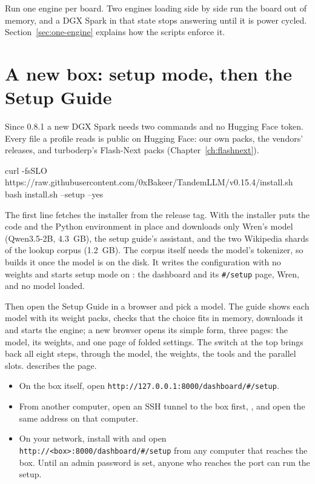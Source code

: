 Run one engine per board. Two engines loading side by side run the board out of memory, and a DGX Spark in that state stops answering until it is power cycled. Section~\ref{sec:one-engine} explains how the scripts enforce it.

\section{A new box: setup mode, then the Setup Guide}\label{sec:new-box}

Since 0.8.1 a new DGX Spark needs two commands and no Hugging Face token. Every file a profile reads is public on Hugging Face: our own packs, the vendors' releases, and turboderp's Flash-Next packs (Chapter~\ref{ch:flashnext}).

\begin{shell}
curl -fsSLO https://raw.githubusercontent.com/0xBakeer/TandemLLM/v0.15.4/install.sh
bash install.sh --setup --yes
\end{shell}

The first line fetches the installer from the release tag. With  the installer puts the code and the Python environment in place and downloads only Wren's model (Qwen3.5-2B, 4.3~GB), the setup guide's assistant, and the two Wikipedia shards of the lookup corpus (1.2~GB). The corpus itself needs the model's tokenizer, so  builds it once the model is on the disk. It writes the configuration with no weights and starts setup mode on : the dashboard and its \texttt{\#/setup} page, Wren, and no model loaded.

Then open the Setup Guide in a browser and pick a model. The guide shows each model with its weight packs, checks that the choice fits in memory, downloads it and starts the engine; a new browser opens its simple form, three pages: the model, its weights, and one page of folded settings. The switch at the top brings back all eight steps, through the model, the weights, the tools and the parallel slots.  describes the page.

\begin{itemize}
\item On the box itself, open \texttt{http://127.0.0.1:8000/dashboard/\#/setup}.
\item From another computer, open an SSH tunnel to the box first, , and open the same address on that computer.
\item On your network, install with  and open \texttt{http://<box>:8000/dashboard/\#/setup} from any computer that reaches the box. Until an admin password is set, anyone who reaches the port can run the setup.
\end{itemize}

